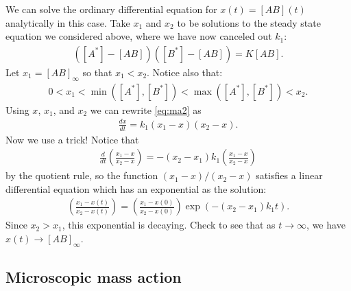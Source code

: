 \documentclass[10pt]{article}
\begin{document}
We can solve the ordinary differential equation for $x(t) = [AB](t)$ analytically in this case.  Take $x_1$ and $x_2$ to be solutions to the steady state equation we considered above, where we have now canceled out $k_1$:
\begin{align*}
([A^*] - [AB])([B^*] - [AB]) = K[AB].
\end{align*}
Let $x_1 = [AB]_\infty$ so that $x_1 < x_2$.  Notice also that:
\begin{align*}
0 < x_1 < \min([A^*],[B^*]) < \max([A^*],[B^*]) < x_2.
\end{align*}
Using $x$, $x_1$, and $x_2$ we can rewrite \eqref{eq:ma2} as
\begin{align*}
\frac{d x}{dt} = k_1 (x_1 - x)(x_2 - x).
\end{align*}
Now we use a trick!  Notice that 
\begin{align*}
\frac{d}{dt} \left( \frac{x_1 - x}{x_2 - x} \right) = -(x_2 - x_1) k_1  \left( \frac{x_1 - x}{x_2 - x} \right)
\end{align*}
by the quotient rule, so the function $(x_1 - x)/(x_2 - x)$ satisfies a linear differential equation which has an exponential as the solution:
\begin{align*}
\left( \frac{x_1 - x(t)}{x_2 - x(t)} \right) = \left( \frac{x_1 - x(0)}{x_2 - x(0)} \right) \exp(-(x_2 - x_1)k_1 t).
\end{align*}
Since $x_2 > x_1$, this exponential is decaying.  Check to see that as $t \rightarrow \infty$, we have $x(t) \rightarrow [AB]_\infty$. 

\subsection{Microscopic mass action}
\end{document}
